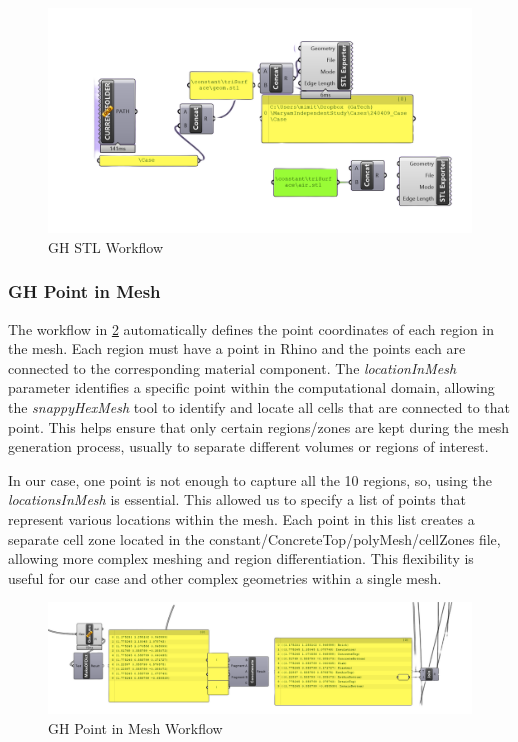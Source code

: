 \begin{figure}[H]
\centering
\includegraphics[width=0.77\columnwidth]{Figures/stlgh.png}
\hspace{0.7cm}
\caption{GH STL Workflow}
\label{stlgh}
\end{figure}



\subsubsection{GH Point in Mesh}
The workflow in \ref{locgh} automatically defines the point coordinates of each region in the mesh. Each region must have a point in Rhino and the points each are connected to the corresponding material component. The \textit{locationInMesh} parameter identifies a specific point within the computational domain, allowing the \textit{snappyHexMesh} tool to identify and locate all cells that are connected to that point. This helps ensure that only certain regions/zones are kept during the mesh generation process, usually to separate different volumes or regions of interest.

In our case, one point is not enough to capture all the 10 regions, so, using the \textit{locationsInMesh} is essential. This allowed us to specify a list of points that represent various locations within the mesh. Each point in this list creates a separate cell zone located in the constant/ConcreteTop/polyMesh/cellZones file, allowing more complex meshing and region differentiation. This flexibility is useful for our case and other complex geometries within a single mesh.

\begin{figure}[tbh]
\centering
\includegraphics[width=0.77\columnwidth]{Figures/locinmeshgh.png}
\hspace{0.7cm}
\caption{GH Point in Mesh Workflow}
\label{locgh}
\end{figure}





